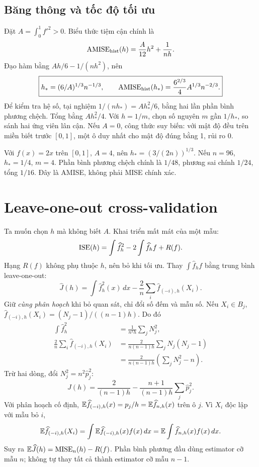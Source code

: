 \subsection{Băng thông và tốc độ tối ưu}
Đặt $A=\int_0^1f'^2>0$. Biểu thức tiệm cận chính là
\[
\operatorname{AMISE}_{\rm hist}(h)=\frac{A}{12}h^2+\frac1{nh}.
\]
Đạo hàm bằng $Ah/6-1/(nh^2)$, nên
\[
\boxed{h_*=(6/A)^{1/3}n^{-1/3},\qquad
\operatorname{AMISE}_{\rm hist}(h_*)=
\frac{6^{2/3}}4 A^{1/3}n^{-2/3}.}
\]
Để kiểm tra hệ số, tại nghiệm $1/(nh_*)=Ah_*^2/6$, bằng hai lần
phần bình phương chệch. Tổng bằng $Ah_*^2/4$.
Với $h=1/m$, chọn số nguyên $m$ gần $1/h_*$, so sánh hai ứng viên
lân cận. Nếu $A=0$, công thức suy biến: với mật độ đều trên miền biết
trước $[0,1]$, một ô duy nhất cho mật độ đúng bằng 1, rủi ro 0.

\begin{example}
Với $f(x)=2x$ trên $[0,1]$, $A=4$, nên
$h_*=(3/(2n))^{1/3}$. Nếu $n=96$, $h_*=1/4$, $m=4$.
Phần bình phương chệch chính là $1/48$, phương sai chính $1/24$,
tổng $1/16$. Đây là AMISE, không phải MISE chính xác.
\end{example}

\section{Leave-one-out cross-validation}
Ta muốn chọn $h$ mà không biết $A$. Khai triển mất mát của một mẫu:
\[
\operatorname{ISE}(h)=\int\widehat f_h^2-2\int\widehat f_h f+R(f).
\]
Hạng $R(f)$ không phụ thuộc $h$, nên bỏ khi tối ưu.
Thay $\int\widehat f_h f$ bằng trung bình leave-one-out:
\[
\widehat J(h)=\int\widehat f_h^2(x)\,dx
-\frac2n\sum_i\widehat f_{(-i),h}(X_i).
\]
Giữ \emph{cùng phân hoạch} khi bỏ quan sát, chỉ đổi số đếm và mẫu số.
Nếu $X_i\in B_j$, $\widehat f_{(-i),h}(X_i)=(N_j-1)/((n-1)h)$.
Do đó
\begin{align*}
\int\widehat f_h^2&=\frac1{n^2h}\sum_jN_j^2,\\
\frac2n\sum_i\widehat f_{(-i),h}(X_i)
&=\frac2{n(n-1)h}\sum_jN_j(N_j-1)\\
&=\frac2{n(n-1)h}\left(\sum_jN_j^2-n\right).
\end{align*}
Trừ hai dòng, đổi $N_j^2=n^2\widehat p_j^2$:
\[
\boxed{\widehat J(h)=\frac2{(n-1)h}
-\frac{n+1}{(n-1)h}\sum_j\widehat p_j^2.}
\]
Với phân hoạch cố định, $\mathbb E\widehat f_{(-i),h}(x)=p_j/h=
\mathbb E\widehat f_{n,h}(x)$ trên ô $j$. Vì $X_i$ độc lập với mẫu bỏ $i$,
\[
\mathbb E\widehat f_{(-i),h}(X_i)
=\int\mathbb E\widehat f_{(-i),h}(x)f(x)\,dx
=\mathbb E\int\widehat f_{n,h}(x)f(x)\,dx.
\]
Suy ra $\mathbb E\widehat J(h)=\operatorname{MISE}_n(h)-R(f)$.
Phần bình phương đầu dùng estimator cỡ mẫu $n$; không tự thay tất cả
thành estimator cỡ mẫu $n-1$.


